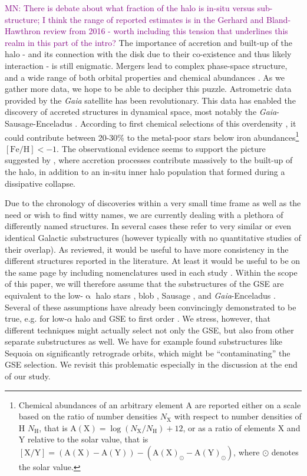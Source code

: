 \documentclass[fleqn,usenatbib]{mnras}
\newcommand{\mkn}[1]{{\textcolor{purple}{MN: #1}}}
\newcommand{\Gaia}{\textit{Gaia}\xspace} %
\begin{document}
\mkn{There is debate about what fraction of the halo is in-situ versus sub-structure; I think the range of reported estimates is in the Gerhard and Bland-Hawthron review from 2016 - worth including this tension that underlines this realm in this part of the intro? }
The importance of accretion and built-up of the halo - and its connection with the disk due to their co-existence and thus likely interaction - is still enigmatic. Mergers lead to complex phase-space structure, and a wide range of both orbital properties and chemical abundances \citep{Koppelman2020b}. As we gather more data, we hope to be able to decipher this puzzle. Astrometric data provided by the \Gaia satellite \citep{Brown2016} has been revolutionary. This data has enabled the discovery of accreted structures in dynamical space, most notably the \Gaia-Sausage-Enceladus \citep[GSE, see e.g.][]{Belokurov2018, Helmi2018, Helmi2020}. According to first chemical selections of this overdensity \citep{Das2020}, it could contribute between 20-30\% to the metal-poor stars below iron abundances\footnote{Chemical abundances of an arbitrary element A are reported either on a scale based on the ratio of number densities $N_\mathrm{X}$ with respect to number densities of H $N_\mathrm{H}$, that is $\mathrm{A(X)} = \log \left(N_\mathrm{X}/N_\mathrm{H} \right) + 12$, or as a ratio of elements X and Y relative to the solar value, that is $\mathrm{[X/Y]} = \left( \mathrm{A(X)} -\mathrm{ A(Y)} \right) - \left( \mathrm{A(X)}_\odot -\mathrm{A(Y)}_\odot \right) $, where $\odot$ denotes the solar value.} $\mathrm{[Fe/H]} < -1$. The observational evidence \citep[for reviews see][]{Nissen2018, Helmi2020} seems to support the picture suggested by \citet{Searle1978}, where accretion processes contribute massively to the built-up of the halo, in addition to an in-situ inner halo population that formed during a dissipative collapse. 

Due to the chronology of discoveries within a very small time frame as well as the need or wish to find witty names, we are currently dealing with a plethora of differently named structures.  In several cases these refer to very similar or even identical Galactic substructures (however typically with no quantitative studies of their overlap). As \citet{Helmi2020} reviewed, it would be useful to have more consistency in the different structures reported in the literature. At least it would be useful to be on the same page by including nomenclatures used in each study \citep[see.e.g][]{An2021b}. Within the scope of this paper, we will therefore assume that the substructures of the GSE are equivalent to the low-$\upalpha$ halo stars \citep{Nissen2010}, blob \citep{Koppelman2018, Das2020}, Sausage \citep{Belokurov2018}, and \Gaia-Enceladus \citep{Helmi2018}. Several of these assumptions have already been convincingly demonstrated to be true, e.g. for low-$\alpha$ halo and GSE to first order \citep{Haywood2018}. We stress, however, that different techniques might actually select not only the GSE, but also from other separate substructures as well.  We have for example found substructures like Sequoia \citep{Myeong2019} on significantly retrograde orbits, which might be ``contaminating'' the GSE selection. We revisit this problematic especially in the discussion at the end of our study.
\end{document}
